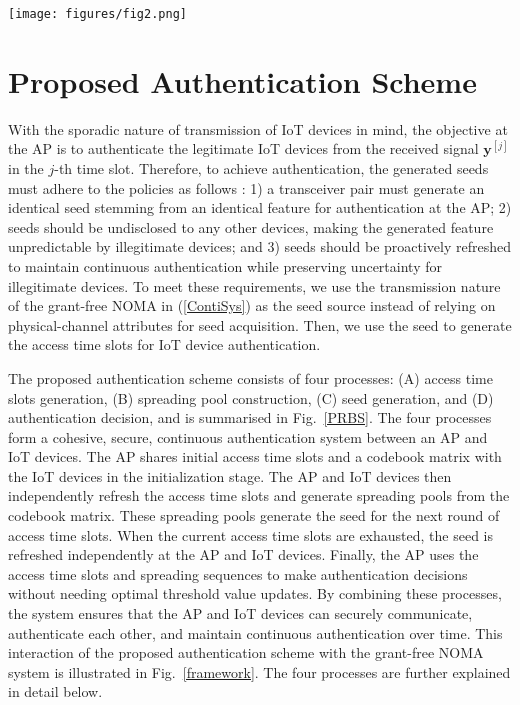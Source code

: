\documentclass[journal,10pt]{IEEEtran}
\begin{document}
\begin{figure*}[t]
\centering
\texttt{[image: figures/fig2.png]} 
\caption{Proposed authentication scheme comprises four processes: access time slots generation, spreading pool construction, seed generation, and authentication decision.}
\label{PRBS}
\end{figure*}



\section{Proposed Authentication Scheme}
With the sporadic nature of transmission of IoT devices in mind, the objective at the AP is to authenticate the legitimate IoT devices from the received signal $\mathbf{y}^{[j]}$ in the $j$-th time slot. Therefore, to achieve authentication, the generated seeds must adhere to the policies as follows \cite{9378574}: 1) a transceiver pair must generate an identical seed stemming from an identical feature for authentication at the AP; 2) seeds should be undisclosed to any other devices, making the generated feature unpredictable by illegitimate devices; and 3) seeds should be proactively refreshed to maintain continuous authentication while preserving uncertainty for illegitimate devices. To meet these requirements, we use the transmission nature of the grant-free NOMA in (\ref{ContiSys}) as the seed source instead of relying on physical-channel attributes for seed acquisition. Then, we use the seed to generate the access time slots for IoT device authentication.

The proposed authentication scheme consists of four processes: (A) access time slots generation, (B) spreading pool construction, (C) seed generation, and (D) authentication decision, and is summarised in Fig.~\ref{PRBS}. The four processes form a cohesive, secure, continuous authentication system between an AP and IoT devices. The AP shares initial access time slots and a codebook matrix with the IoT devices in the initialization stage. The AP and IoT devices then independently refresh the access time slots and generate spreading pools from the codebook matrix. These spreading pools generate the seed for the next round of access time slots. When the current access time slots are exhausted, the seed is refreshed independently at the AP and IoT devices. Finally, the AP uses the access time slots and spreading sequences to make authentication decisions without needing optimal threshold value updates. By combining these processes, the system ensures that the AP and IoT devices can securely communicate, authenticate each other, and maintain continuous authentication over time. This interaction of the proposed authentication scheme with the grant-free NOMA system is illustrated in Fig.~\ref{framework}. The four processes are further explained in detail below.
\end{document}
